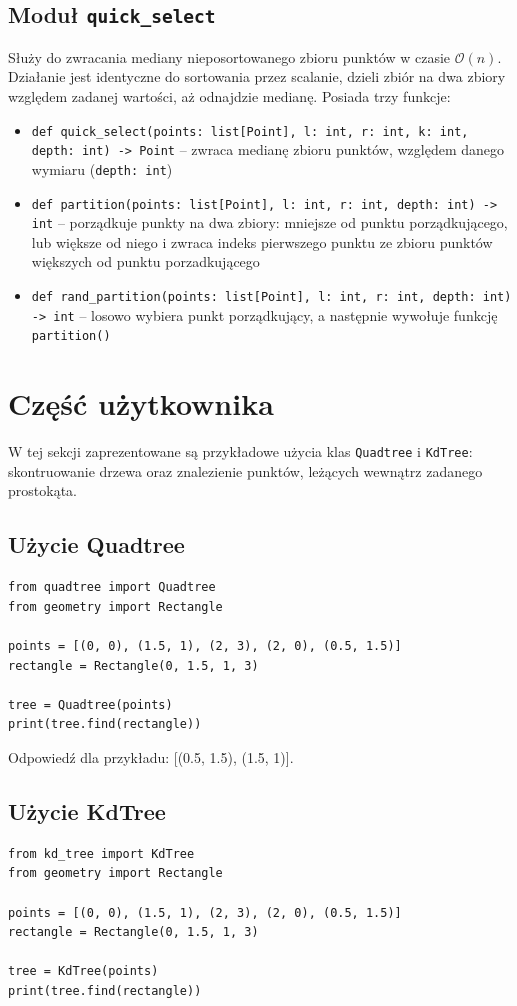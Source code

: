 \documentclass[11pt]{scrartcl}
\newcommand{\sO}{\mathcal O}
\begin{document}
\subsection{Moduł \texttt{quick\_select}}
Służy do zwracania mediany nieposortowanego zbioru punktów w czasie $\sO(n)$. Działanie jest identyczne do sortowania przez scalanie, dzieli zbiór na dwa zbiory względem zadanej wartości, aż odnajdzie medianę. Posiada trzy funkcje:
\begin{itemize}
    \item \texttt{def quick\_select(points: list[Point], l: int, r: int, k: int, depth: int) -> Point} -- zwraca medianę zbioru punktów, względem danego wymiaru (\texttt{depth: int})
    \item \texttt{def partition(points: list[Point], l: int, r: int, depth: int) -> int} -- porządkuje punkty na dwa zbiory: mniejsze od punktu porządkującego, lub większe od niego i zwraca indeks pierwszego punktu ze zbioru punktów większych od punktu porzadkującego 
    \item \texttt{def rand\_partition(points: list[Point], l: int, r: int, depth: int) -> int} -- losowo wybiera punkt porządkujący, a następnie wywołuje funkcję \texttt{partition()}
\end{itemize}

\section{Część użytkownika}
W tej sekcji zaprezentowane są przykładowe użycia klas \texttt{Quadtree} i \texttt{KdTree}: skontruowanie drzewa oraz znalezienie punktów, leżących wewnątrz zadanego prostokąta.

\subsection{Użycie Quadtree}
\begin{verbatim}
from quadtree import Quadtree
from geometry import Rectangle

points = [(0, 0), (1.5, 1), (2, 3), (2, 0), (0.5, 1.5)]
rectangle = Rectangle(0, 1.5, 1, 3)

tree = Quadtree(points)
print(tree.find(rectangle))
\end{verbatim}

Odpowiedź dla przykładu: [(0.5, 1.5), (1.5, 1)].

\subsection{Użycie KdTree}
\begin{verbatim}
from kd_tree import KdTree
from geometry import Rectangle

points = [(0, 0), (1.5, 1), (2, 3), (2, 0), (0.5, 1.5)]
rectangle = Rectangle(0, 1.5, 1, 3)

tree = KdTree(points)
print(tree.find(rectangle))
\end{verbatim}
\end{document}
